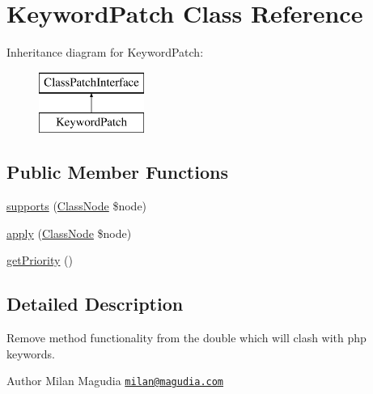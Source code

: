 \hypertarget{class_prophecy_1_1_doubler_1_1_class_patch_1_1_keyword_patch}{}\section{Keyword\+Patch Class Reference}
\label{class_prophecy_1_1_doubler_1_1_class_patch_1_1_keyword_patch}
Inheritance diagram for Keyword\+Patch\+:\begin{figure}[H]
\begin{center}
\leavevmode
\includegraphics[height=2.000000cm]{class_prophecy_1_1_doubler_1_1_class_patch_1_1_keyword_patch}
\end{center}
\end{figure}
\subsection*{Public Member Functions}
\begin{DoxyCompactItemize}
\item 
\mbox{\hyperlink{class_prophecy_1_1_doubler_1_1_class_patch_1_1_keyword_patch_a99b2455ac194faf79aff042c55719ac2}{supports}} (\mbox{\hyperlink{class_prophecy_1_1_doubler_1_1_generator_1_1_node_1_1_class_node}{Class\+Node}} \$node)
\item 
\mbox{\hyperlink{class_prophecy_1_1_doubler_1_1_class_patch_1_1_keyword_patch_a62fdb697928f35fc782d6889b8fe9b8b}{apply}} (\mbox{\hyperlink{class_prophecy_1_1_doubler_1_1_generator_1_1_node_1_1_class_node}{Class\+Node}} \$node)
\item 
\mbox{\hyperlink{class_prophecy_1_1_doubler_1_1_class_patch_1_1_keyword_patch_a1e7a3c168dcd0901a0d2669c67575b55}{get\+Priority}} ()
\end{DoxyCompactItemize}


\subsection{Detailed Description}
Remove method functionality from the double which will clash with php keywords.

\begin{DoxyAuthor}{Author}
Milan Magudia \href{mailto:milan@magudia.com}{\tt milan@magudia.\+com} 
\end{DoxyAuthor}


